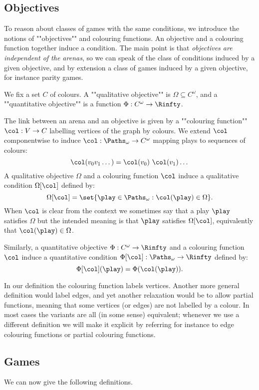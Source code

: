 \subsection*{Objectives}
To reason about classes of games with the same conditions, we introduce the notions of ""objectives"" and colouring functions.
An objective and a colouring function together induce a condition.
The main point is that \textit{objectives are independent of the arenas}, so we can speak of the class of conditions induced by a given objective,
and by extension a class of games induced by a given objective, for instance parity games.

We fix a set $C$ of colours. 
A ""qualitative objective"" is $\Omega \subseteq C^\omega$, and a ""quantitative objective"" is a function $\Phi : C^\omega \to \Rinfty$. 

The link between an arena and an objective is given by a ""colouring function"" $\col : V \to C$ labelling vertices of the graph by colours.
We extend $\col$ componentwise to induce $\col : \Paths_\omega \to C^\omega$ mapping plays to sequences of colours:
\[
\col(v_0 v_1 \dots) = \col(v_0)\ \col(v_1) \dots
\]
A qualitative objective $\Omega$ and a colouring function $\col$ induce a qualitative condition $\Omega[\col]$ defined by:
\[
\Omega[\col] = \set{\play \in \Paths_\omega : \col(\play) \in \Omega}.
\] 
When $\col$ is clear from the context we sometimes say that a play $\play$ satisfies $\Omega$ but the intended meaning is that 
$\play$ satisfies $\Omega[\col]$, equivalently that $\col(\play) \in \Omega$.

Similarly, a quantitative objective $\Phi : C^\omega \to \Rinfty$ and a colouring function $\col$ induce 
a quantitative condition $\Phi[\col] : \Paths_\omega \to \Rinfty$ defined by:
\[
\Phi[\col](\play) = \Phi(\col(\play)).
\]

\begin{remark}
In our definition the colouring function labels vertices.
Another more general definition would label edges, and yet another relaxation would be to allow partial functions,
meaning that some vertices (or edges) are not labelled by a colour.
In most cases the variants are all (in some sense) equivalent; 
whenever we use a different definition we will make it explicit by referring for instance to edge colouring functions
or partial colouring functions.
\end{remark}

\subsection*{Games}
We can now give the following definitions.

